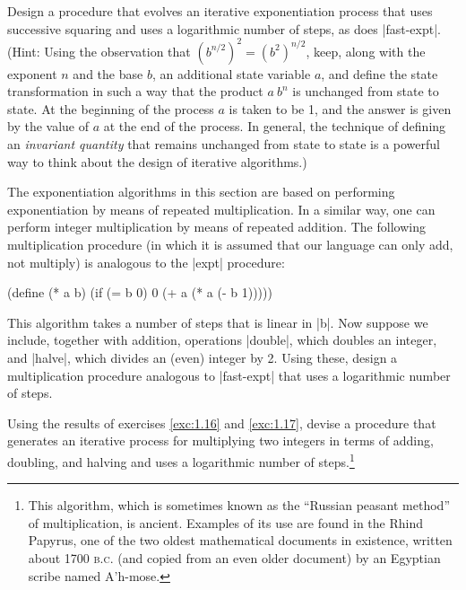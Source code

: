 \begin{Exercise}
\label{exc:1.16}
Design a procedure that evolves an iterative exponentiation process
that uses successive squaring and uses a logarithmic number of steps,
as does \scheme|fast-expt|.  (Hint: Using the observation that
$(b^{n/2})^2 = (b^2)^{n/2}$, keep, along with the exponent $n$ and the
base $b$, an additional state variable $a$, and define the state
transformation in such a way that the product $a~b ^n$ is unchanged
from state to state.  At the beginning of the process $a$ is taken to
be 1, and the answer is given by the value of $a$ at the end of the
process.  In general, the technique of defining an \textit{invariant
  quantity} that remains unchanged from state to state is a powerful
way to think about the design of iterative algorithms.)
\end{Exercise}

\begin{Exercise}
\label{exc:1.17}
The exponentiation algorithms in this section are based on performing
exponentiation by means of repeated multiplication.  In a similar way,
one can perform integer multiplication by means of repeated addition.
The following multiplication procedure (in which it is assumed that
our language can only add, not multiply) is analogous to the \scheme|expt| procedure:

\begin{schemedisplay}
(define (* a b)
  (if (= b 0)
      0
      (+ a (* a (- b 1)))))
\end{schemedisplay}

This algorithm takes a number of steps that is linear in \scheme|b|.
Now suppose we include, together with addition, operations \scheme|double|,
which doubles an integer, and \scheme|halve|, which divides an (even)
integer by 2.  Using these, design a multiplication procedure analogous
to \scheme|fast-expt| that uses a logarithmic number of steps. 
\end{Exercise}

\begin{Exercise}
\label{exc:1.18}
Using the results of exercises \ref{exc:1.16} and \ref{exc:1.17},
devise a procedure that generates an iterative process for multiplying
two integers in terms of adding, doubling, and halving and uses a
logarithmic number of steps.\footnote{This algorithm, which is
  sometimes known as the ``Russian peasant method'' of multiplication,
  is ancient.  Examples of its use are found in the Rhind Papyrus, one
  of the two oldest mathematical documents in existence, written about
  1700 \textsc{b.c}. (and copied from an even older document) by an
  Egyptian scribe named A'h-mose.} 
\end{Exercise}

